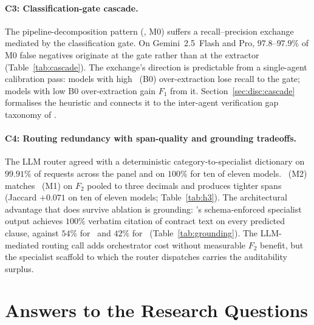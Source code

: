 \paragraph{C3: Classification-gate cascade.}
The pipeline-decomposition pattern (\cfgCX, M0) suffers a recall--precision
exchange mediated by the classification gate. On Gemini~2.5~Flash and Pro,
$97.8$--$97.9\%$ of M0 false negatives originate at the gate rather than at
the extractor (Table~\ref{tab:cascade}). The exchange's direction is
predictable from a single-agent calibration pass: models with high \cfgZS\
(B0) over-extraction lose recall to the gate; models with low B0 over-extraction
gain $F_1$ from it. Section~\ref{sec:disc:cascade} formalises the heuristic
and connects it to the inter-agent verification gap taxonomy of
\textcite{cemri2025why}.

\paragraph{C4: Routing redundancy with span-quality and grounding tradeoffs.}
The LLM router agreed with a deterministic category-to-specialist dictionary
on $99.91\%$ of requests across the panel and on $100\%$ for ten of eleven
models. \cfgCP\ (M2) matches \cfgMA\ (M1) on $F_2$ pooled to three decimals
and produces tighter spans (Jaccard $+0.071$ on ten of eleven models;
Table~\ref{tab:h3}). The architectural advantage that does survive ablation
is grounding: \cfgMA's schema-enforced specialist output achieves
$100\%$ verbatim citation of contract text on every predicted clause, against
$54\%$ for \cfgZS\ and $42\%$ for \cfgCP\ (Table~\ref{tab:grounding}). The
LLM-mediated routing call adds orchestrator cost without measurable $F_2$
benefit, but the specialist scaffold to which the router dispatches carries
the auditability surplus.

\section{Answers to the Research Questions}\label{sec:concl:rqs}

